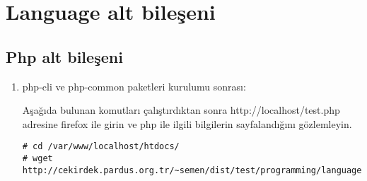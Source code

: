 \documentclass[a4paper,10pt]{article}
\begin{document}
\section{Language alt bileşeni}
\subsection{Php alt bileşeni}
\begin{enumerate}


 \item php-cli ve php-common paketleri kurulumu sonrası:

Aşağıda bulunan komutları çalıştırdıktan sonra http://localhost/test.php adresine firefox ile girin ve php ile ilgili bilgilerin sayfalandığını gözlemleyin.

\begin{verbatim}
# cd /var/www/localhost/htdocs/
# wget http://cekirdek.pardus.org.tr/~semen/dist/test/programming/language/php/test.php 
\end{verbatim}

\end{enumerate}
\end{document}
